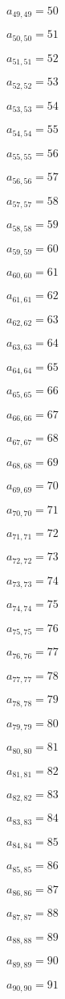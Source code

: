 \documentclass[a4paper,12pt]{article}
\begin{document}
$a _{ 49, 49 } = 50$

$a _{ 50, 50 } = 51$

$a _{ 51, 51 } = 52$

$a _{ 52, 52 } = 53$

$a _{ 53, 53 } = 54$

$a _{ 54, 54 } = 55$

$a _{ 55, 55 } = 56$

$a _{ 56, 56 } = 57$

$a _{ 57, 57 } = 58$

$a _{ 58, 58 } = 59$

$a _{ 59, 59 } = 60$

$a _{ 60, 60 } = 61$

$a _{ 61, 61 } = 62$

$a _{ 62, 62 } = 63$

$a _{ 63, 63 } = 64$

$a _{ 64, 64 } = 65$

$a _{ 65, 65 } = 66$

$a _{ 66, 66 } = 67$

$a _{ 67, 67 } = 68$

$a _{ 68, 68 } = 69$

$a _{ 69, 69 } = 70$

$a _{ 70, 70 } = 71$

$a _{ 71, 71 } = 72$

$a _{ 72, 72 } = 73$

$a _{ 73, 73 } = 74$

$a _{ 74, 74 } = 75$

$a _{ 75, 75 } = 76$

$a _{ 76, 76 } = 77$

$a _{ 77, 77 } = 78$

$a _{ 78, 78 } = 79$

$a _{ 79, 79 } = 80$

$a _{ 80, 80 } = 81$

$a _{ 81, 81 } = 82$

$a _{ 82, 82 } = 83$

$a _{ 83, 83 } = 84$

$a _{ 84, 84 } = 85$

$a _{ 85, 85 } = 86$

$a _{ 86, 86 } = 87$

$a _{ 87, 87 } = 88$

$a _{ 88, 88 } = 89$

$a _{ 89, 89 } = 90$

$a _{ 90, 90 } = 91$
\end{document}

